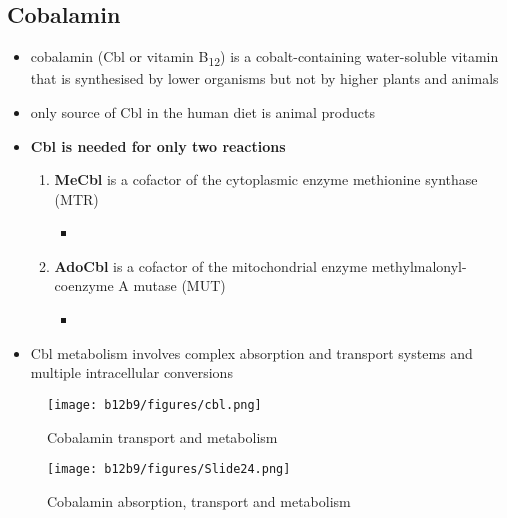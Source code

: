 \documentclass[12pt]{scrartcl}
\begin{document}
\subsection{Cobalamin}
\label{sec:orge55e8da}
\begin{itemize}
\item cobalamin (Cbl or vitamin B\textsubscript{12}) is a cobalt-containing
water-soluble vitamin that is synthesised by lower organisms but not
by higher plants and animals
\item only source of Cbl in the human diet is animal products
\item \textbf{Cbl is needed for only two reactions}
\begin{enumerate}
\item \textbf{MeCbl} is a cofactor of the cytoplasmic enzyme methionine synthase (MTR)
\begin{itemize}
\item {}
\end{itemize}
\item \textbf{AdoCbl} is a cofactor of the mitochondrial enzyme methylmalonyl-coenzyme A mutase (MUT)
\begin{itemize}
\item {}
\end{itemize}
\end{enumerate}
\item Cbl metabolism involves complex absorption and transport systems and
multiple intracellular conversions
\end{itemize}

\begin{figure}[htbp]
\centering
\texttt{[image: b12b9/figures/cbl.png]}
\caption{\label{fig:orgc567321}Cobalamin transport and metabolism}
\end{figure}

\begin{figure}[htbp]
\centering
\texttt{[image: b12b9/figures/Slide24.png]}
\caption{\label{fig:org8f53eb0}Cobalamin absorption, transport and metabolism}
\end{figure}
\end{document}
